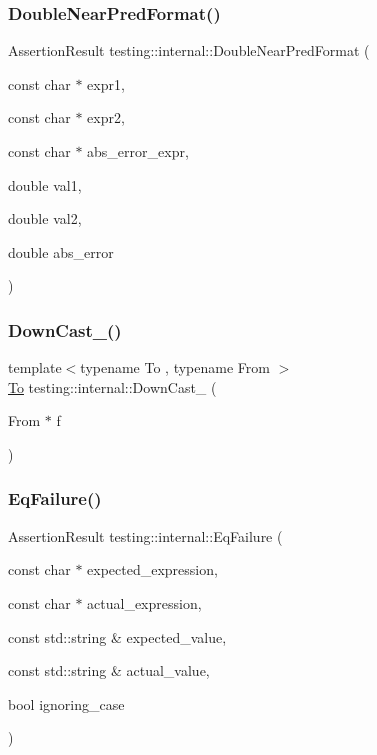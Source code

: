 \subsubsection{\texorpdfstring{DoubleNearPredFormat()}{DoubleNearPredFormat()}}
{\footnotesize\ttfamily Assertion\+Result testing\+::internal\+::\+Double\+Near\+Pred\+Format (\begin{DoxyParamCaption}\item[{const char $\ast$}]{expr1,  }\item[{const char $\ast$}]{expr2,  }\item[{const char $\ast$}]{abs\+\_\+error\+\_\+expr,  }\item[{double}]{val1,  }\item[{double}]{val2,  }\item[{double}]{abs\+\_\+error }\end{DoxyParamCaption})}

\mbox{\label{namespacetesting_1_1internal_a1a1a1aed3fe00908b8a45d5ab4a33665}} 
\subsubsection{\texorpdfstring{DownCast\_()}{DownCast\_()}}
{\footnotesize\ttfamily template$<$typename To , typename From $>$ \\
\mbox{\hyperlink{classtesting_1_1internal_1_1To}{To}} testing\+::internal\+::\+Down\+Cast\+\_\+ (\begin{DoxyParamCaption}\item[{From $\ast$}]{f }\end{DoxyParamCaption})\hspace{0.3cm}{\ttfamily [inline]}}

\mbox{\label{namespacetesting_1_1internal_a08725846ff184d3e79bcf5be4df19157}} 
\subsubsection{\texorpdfstring{EqFailure()}{EqFailure()}}
{\footnotesize\ttfamily Assertion\+Result testing\+::internal\+::\+Eq\+Failure (\begin{DoxyParamCaption}\item[{const char $\ast$}]{expected\+\_\+expression,  }\item[{const char $\ast$}]{actual\+\_\+expression,  }\item[{const std\+::string \&}]{expected\+\_\+value,  }\item[{const std\+::string \&}]{actual\+\_\+value,  }\item[{bool}]{ignoring\+\_\+case }\end{DoxyParamCaption})}

